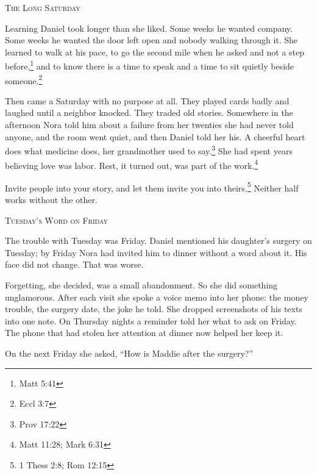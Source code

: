 \documentclass[10.5pt]{article}
\begin{document}
\newpage

\begin{center}
    {\scshape\large The Long Saturday}\par
    \vspace{0.8em}
\end{center}

Learning Daniel took longer than she liked. Some weeks he wanted company. Some weeks he wanted the door left open and nobody walking through it. She learned to walk at his pace, to go the second mile when he asked and not a step before,\footnote{Matt 5:41} and to know there is a time to speak and a time to sit quietly beside someone.\footnote{Eccl 3:7}

Then came a Saturday with no purpose at all. They played cards badly and laughed until a neighbor knocked. They traded old stories. Somewhere in the afternoon Nora told him about a failure from her twenties she had never told anyone, and the room went quiet, and then Daniel told her his. A cheerful heart does what medicine does, her grandmother used to say.\footnote{Prov 17:22} She had spent years believing love was labor. Rest, it turned out, was part of the work.\footnote{Matt 11:28; Mark 6:31}

Invite people into your story, and let them invite you into theirs.\footnote{1 Thess 2:8; Rom 12:15} Neither half works without the other.

\vspace{1.5em}

\begin{center}
    {\scshape\large Tuesday's Word on Friday}\par
    \vspace{0.8em}
\end{center}

The trouble with Tuesday was Friday. Daniel mentioned his daughter's surgery on Tuesday; by Friday Nora had invited him to dinner without a word about it. His face did not change. That was worse.

Forgetting, she decided, was a small abandonment. So she did something unglamorous. After each visit she spoke a voice memo into her phone: the money trouble, the surgery date, the joke he told. She dropped screenshots of his texts into one note. On Thursday nights a reminder told her what to ask on Friday. The phone that had stolen her attention at dinner now helped her keep it.

\newpage

On the next Friday she asked, ``How is Maddie after the surgery?''
\end{document}
